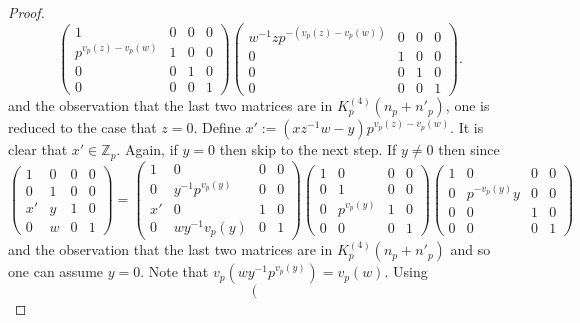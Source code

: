 \documentclass[11pt]{amsart}
\newcommand{\mirp}[1]{K_p^{(4)}(#1)}
\begin{document}
\begin{proof}
$$		\left(\begin{smallmatrix}
			1 & 0 & 0 & 0 \\
			p^{v_p(z) - v_p(w)} & 1 & 0 & 0 \\
			0 & 0 & 1 & 0\\
			0 & 0 & 0 & 1
		\end{smallmatrix}\right)
		\left(\begin{smallmatrix}
			w^{-1}z p^{-(v_p(z) - v_p(w))} & 0 & 0 & 0 \\
			0 & 1 & 0 & 0 \\
			0 & 0 & 1 & 0 \\
			0 & 0 & 0 & 1
		\end{smallmatrix}\right).
$$
and the observation that the last two matrices are in $\mirp{n_p + n'_p}$, one is reduced to the case that $z = 0$. 
Define $x' := (xz^{-1}w-y)p^{v_p(z) - v_p(w)}.$ It is clear that $x'\in \mathbb{Z}_p$.
Again, if $y = 0$ then skip to the next step. If $y \neq 0$ then since
$$
		\left(\begin{smallmatrix}
			1 & 0 & 0 & 0 \\
			0 & 1 & 0 & 0 \\
			x' & y & 1 & 0 \\
			0 & w & 0 & 1
		\end{smallmatrix}\right)
		= \left(\begin{smallmatrix}
			1 & 0 & 0 & 0 \\
			0 & y^{-1}p^{v_p(y)} & 0 & 0 \\
			x' & 0 & 1 & 0 \\
			0 & wy^{-1} v_p(y) & 0 & 1
		\end{smallmatrix}\right) 
		\left(\begin{smallmatrix}
			1 & 0 & 0 & 0 \\
			0 & 1 & 0 & 0 \\
			0 & p^{v_p(y)} & 1 & 0 \\
			0 & 0 & 0 & 1
		\end{smallmatrix}\right)
		\left(\begin{smallmatrix}
			1 & 0 & 0 & 0 \\
			0 & p^{-v_p(y)} y & 0 & 0\\
			0 & 0 & 1 & 0\\
			0 & 0 & 0 & 1
		\end{smallmatrix}\right)
$$
and the observation that the last two matrices are in $\mirp{n_p + n'_p}$ and so one can assume $y = 0.$ Note that $v_p(wy^{-1}p^{v_p(y)}) = v_p(w)$. 
Using 
	\[ \left(\begin{smallmatrix}

\end{smallmatrix}\]
\end{proof}
\end{document}
